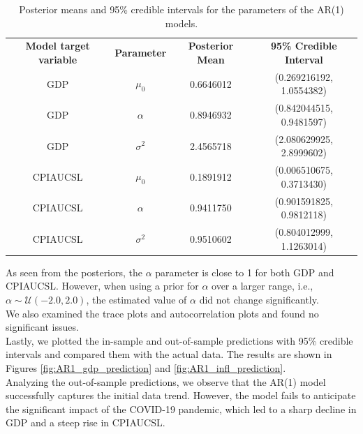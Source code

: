 \begin{table}[H]
    \centering
    \begin{tabular}{c|c|c|c}
        \textbf{Model target variable } & \textbf{Parameter } & \textbf{Posterior Mean } & \textbf{95\% Credible Interval } \\
        \cline{1-4}
        GDP      & $\mu_0$    & 0.6646012 & (0.269216192, 1.0554382) \\
        GDP      & $\alpha$   & 0.8946932 & (0.842044515, 0.9481597) \\
        GDP      & $\sigma^2$ & 2.4565718 & (2.080629925, 2.8999602) \\
        CPIAUCSL & $\mu_0$    & 0.1891912 & (0.006510675, 0.3713430) \\
        CPIAUCSL & $\alpha$   & 0.9411750 & (0.901591825, 0.9812118) \\
        CPIAUCSL & $\sigma^2$ & 0.9510602 & (0.804012999, 1.1263014) \\
    \end{tabular}
    \caption{Posterior means and 95\% credible intervals for the parameters of the AR(1) models.}
    \label{tab:AR1_posteriors}
\end{table}
As seen from the posteriors, the $\alpha$ parameter is close to 1 for both GDP and CPIAUCSL. However, when using a prior for $\alpha$ over a larger range, i.e., $\alpha \sim \mathcal{U}(-2.0, 2.0)$, the estimated value of $\alpha$ did not change significantly. \\
We also examined the trace plots and autocorrelation plots and found no significant issues. \\
Lastly, we plotted the in-sample and out-of-sample predictions with 95\% credible intervals and compared them with the actual data. The results are shown in Figures \ref{fig:AR1_gdp_prediction} and \ref{fig:AR1_infl_prediction}. \\
Analyzing the out-of-sample predictions, we observe that the AR(1) model successfully captures the initial data trend. However, the model fails to anticipate the significant impact of the COVID-19 pandemic, which led to a sharp decline in GDP and a steep rise in CPIAUCSL. \\
